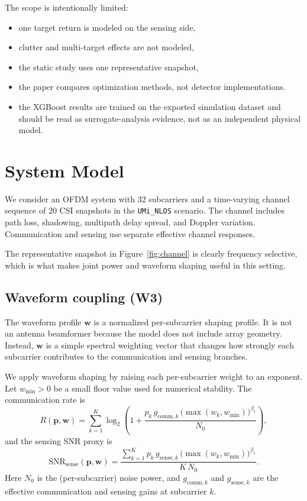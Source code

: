 \documentclass[runningheads]{llncs}
\begin{document}
The scope is intentionally limited:
\begin{itemize}
  \item one target return is modeled on the sensing side,
  \item clutter and multi-target effects are not modeled,
  \item the static study uses one representative snapshot,
  \item the paper compares optimization methods, not detector implementations.
  \item the XGBoost results are trained on the exported simulation dataset and should be read as surrogate-analysis evidence, not as an independent physical model.
\end{itemize}

\section{System Model}
We consider an OFDM system with 32 subcarriers and a time-varying channel sequence of 20 CSI snapshots in the \texttt{UMi\_NLOS} scenario. The channel includes path loss, shadowing, multipath delay spread, and Doppler variation. Communication and sensing use separate effective channel responses.

The representative snapshot in Figure~\ref{fig:channel} is clearly frequency selective, which is what makes joint power and waveform shaping useful in this setting.

\subsection{Waveform coupling (W3)}
The waveform profile $\mathbf{w}$ is a normalized per-subcarrier shaping profile. It is not an antenna beamformer because the model does not include array geometry. Instead, $\mathbf{w}$ is a simple spectral weighting vector that changes how strongly each subcarrier contributes to the communication and sensing branches.

We apply waveform shaping by raising each per-subcarrier weight to an exponent. Let $w_{\min}>0$ be a small floor value used for numerical stability. The communication rate is
\begin{equation}
R(\mathbf{p},\mathbf{w}) = \sum_{k=1}^{K} \log_2\!\left(1 + \frac{p_k\, g_{\mathrm{comm},k}\,\bigl(\max(w_k, w_{\min})\bigr)^{\beta_c}}{N_0}\right),
\label{eq:rate}
\end{equation}
and the sensing SNR proxy is
\begin{equation}
\mathrm{SNR}_{\mathrm{sense}}(\mathbf{p},\mathbf{w}) =
\frac{\sum_{k=1}^{K} p_k\, g_{\mathrm{sense},k}\,\bigl(\max(w_k, w_{\min})\bigr)^{\beta_s}}{K\,N_0}.
\label{eq:sensing_snr}
\end{equation}
Here $N_0$ is the (per-subcarrier) noise power, and $g_{\mathrm{comm},k}$ and $g_{\mathrm{sense},k}$ are the effective communication and sensing gains at subcarrier $k$.
\end{document}
